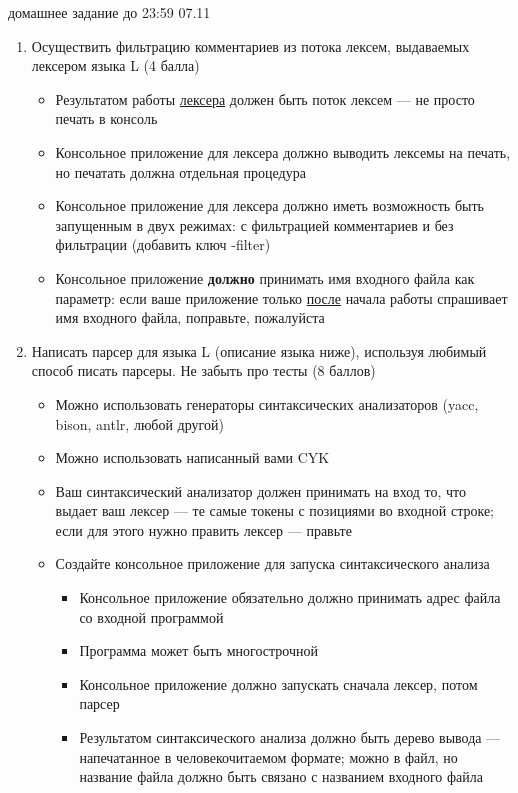 \documentclass{article}
\begin{document}

{\Large домашнее задание до 23:59 07.11}
\bigskip

\begin{enumerate}
  \item Осуществить фильтрацию комментариев из потока лексем, выдаваемых лексером языка L (4 балла)
  \begin{itemize}
      \item Результатом работы \underline{лексера} должен быть поток лексем --- не просто печать в консоль
      \item Консольное приложение для лексера должно выводить лексемы на печать, но печатать должна отдельная процедура
      \item Консольное приложение для лексера должно иметь возможность быть запущенным в двух режимах: с фильтрацией комментариев и без фильтрации (добавить ключ -filter)
      \item Консольное приложение \textbf{должно} принимать имя входного файла как параметр: если ваше приложение только \underline{после} начала работы спрашивает имя входного файла, поправьте, пожалуйста
  \end{itemize}
  \item Написать парсер для языка L (описание языка ниже), используя любимый способ писать парсеры. Не забыть про тесты (8 баллов)
    \begin{itemize}
        \item Можно использовать генераторы синтаксических анализаторов (yacc, bison, antlr, любой другой)
        \item Можно использовать написанный вами CYK
        \item Ваш синтаксический анализатор должен принимать на вход то, что выдает ваш лексер --- те самые токены с позициями во входной строке; если для этого нужно править лексер --- правьте
        \item Создайте консольное приложение для запуска синтаксического анализа
        \begin{itemize}
            \item Консольное приложение обязательно должно принимать адрес файла со входной программой
            \item Программа может быть многострочной
            \item Консольное приложение должно запускать сначала лексер, потом парсер
            \item Результатом синтаксического анализа должно быть дерево вывода --- напечатанное в человекочитаемом формате; можно в файл, но название файла должно быть связано с названием входного файла

\end{itemize}
\end{itemize}
\end{enumerate}
\end{document}
